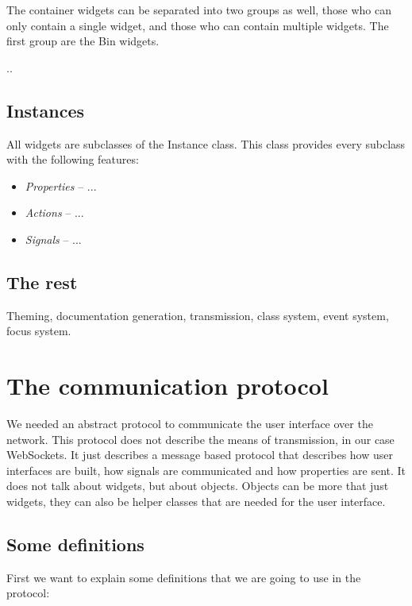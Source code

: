 \documentclass[11pt]{article}
\begin{document}
The container widgets can be separated into two groups as well, those who can only contain a single widget, and those who can contain multiple widgets.
The first group are the Bin widgets.

..

\subsection{Instances}

All widgets are subclasses of the Instance class.
This class provides every subclass with the following features:

\begin{itemize}
\item \textit{Properties} -- ...
\item \textit{Actions} -- ...
\item \textit{Signals} -- ...
\end{itemize}

\subsection{The rest}

Theming, documentation generation, transmission, class system, event system, focus system.

\newpage
\section{The communication protocol}

We needed an abstract protocol to communicate the user interface over the network.
This protocol does not describe the means of transmission, in our case WebSockets.
It just describes a message based protocol that describes how user interfaces are built, how signals are communicated and how properties are sent.
It does not talk about widgets, but about objects. Objects can be more that just widgets, they can also be helper classes that are needed for the user interface.

\subsection{Some definitions}

First we want to explain some definitions that we are going to use in the protocol:
\end{document}
